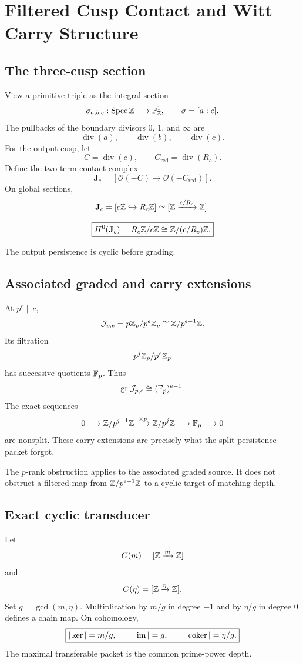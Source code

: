 \chapter{Filtered Cusp Contact and Witt Carry Structure}

\section{The three-cusp section}
View a primitive triple as the integral section
\[
 \sigma_{a,b,c}:
 \operatorname{Spec}\mathbb Z\longrightarrow\mathbb P^1_\mathbb Z,
 \qquad
 \sigma=[a:c].
\]
The pullbacks of the boundary divisors $0$, $1$, and $\infty$ are
\[
 \operatorname{div}(a),
 \qquad
 \operatorname{div}(b),
 \qquad
 \operatorname{div}(c).
\]
For the output cusp, let
\[
 C=\operatorname{div}(c),
 \qquad
 C_{\mathrm{red}}=\operatorname{div}(R_c).
\]
Define the two-term contact complex
\[
 \boxed{
 \mathbf J_c
 =
 [\mathcal O(-C)\longrightarrow\mathcal O(-C_{\mathrm{red}})].
 }
\]
On global sections,
\[
 \mathbf J_c
 =
 [c\mathbb Z\hookrightarrow R_c\mathbb Z]
 \simeq
 [\mathbb Z\xrightarrow{c/R_c}\mathbb Z].
\]

\begin{theorem}
\[
 \boxed{
 H^0(\mathbf J_c)
 =
 R_c\mathbb Z/c\mathbb Z
 \cong
 \mathbb Z/(c/R_c)\mathbb Z.
 }
\]
\end{theorem}

The output persistence is cyclic before grading.

\section{Associated graded and carry extensions}
At $p^e\parallel c$,
\[
 \mathcal J_{p,e}
 =
 p\mathbb Z_p/p^e\mathbb Z_p
 \cong
 \mathbb Z/p^{e-1}\mathbb Z.
\]
Its filtration
\[
 p^j\mathbb Z_p/p^e\mathbb Z_p
\]
has successive quotients $\mathbb F_p$. Thus
\[
 \operatorname{gr}\mathcal J_{p,e}\cong(\mathbb F_p)^{e-1}.
\]
The exact sequences
\[
 0\longrightarrow
 \mathbb Z/p^{j-1}\mathbb Z
 \xrightarrow{\times p}
 \mathbb Z/p^j\mathbb Z
 \longrightarrow
 \mathbb F_p
 \longrightarrow0
\]
are nonsplit. These carry extensions are precisely what the split persistence packet forgot.

\begin{corollary}
The $p$-rank obstruction applies to the associated graded source. It does not obstruct a filtered map from $\mathbb Z/p^{e-1}\mathbb Z$ to a cyclic target of matching depth.
\end{corollary}

\section{Exact cyclic transducer}
Let
\[
 C(m)=[\mathbb Z\xrightarrow{m}\mathbb Z]
\]
and
\[
 C(\eta)=[\mathbb Z\xrightarrow{\eta}\mathbb Z].
\]
Set $g=\gcd(m,\eta)$. Multiplication by $m/g$ in degree $-1$ and by $\eta/g$ in degree $0$ defines a chain map. On cohomology,
\[
 \boxed{
 |\ker|=m/g,
 \qquad
 |\operatorname{im}|=g,
 \qquad
 |\operatorname{coker}|=\eta/g.
 }
\]
The maximal transferable packet is the common prime-power depth.

